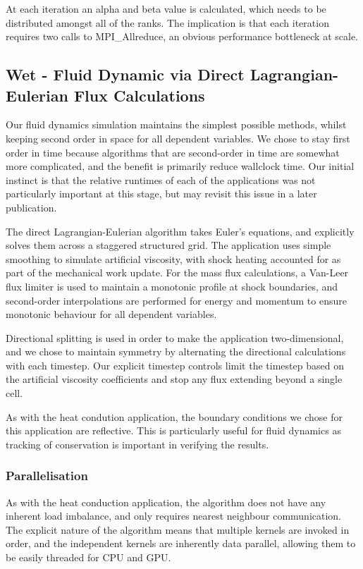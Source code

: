 \documentclass[runningheads,a4paper]{llncs}
\begin{document}
At each iteration an alpha and beta value is calculated, which needs to be distributed amongst all of the ranks. The implication is that each iteration requires two calls to MPI\_Allreduce, an obvious performance bottleneck at scale. 

\subsection{Wet - Fluid Dynamic via Direct Lagrangian-Eulerian Flux Calculations}

Our fluid dynamics simulation maintains the simplest possible methods, whilst keeping second order in space for all dependent variables. We chose to stay first order in time because algorithms that are second-order in time are somewhat more complicated, and the benefit is primarily reduce wallclock time. Our initial instinct is that the relative runtimes of each of the applications was not particularly important at this stage, but may revisit this issue in a later publication.

The direct Lagrangian-Eulerian algorithm takes Euler's equations, and explicitly solves them across a staggered structured grid. The application uses simple smoothing to simulate artificial viscosity, with shock heating accounted for as part of the mechanical work update. For the mass flux calculations, a Van-Leer flux limiter is used to maintain a monotonic profile at shock boundaries, and second-order interpolations are performed for energy and momentum to ensure monotonic behaviour for all dependent variables.

Directional splitting is used in order to make the application two-dimensional, and we chose to maintain symmetry by alternating the directional calculations with each timestep. Our explicit timestep controls limit the timestep based on the artificial viscosity coefficients and stop any flux extending beyond a single cell.

As with the heat condution application, the boundary conditions we chose for this application are reflective. This is particularly useful for fluid dynamics as tracking of conservation is important in verifying the results.

\subsubsection{Parallelisation}

As with the heat conduction application, the algorithm does not have any inherent load imbalance, and only requires nearest neighbour communication. The explicit nature of the algorithm means that multiple kernels are invoked in order, and the independent kernels are inherently data parallel, allowing them to be easily threaded for CPU and GPU.
\end{document}
